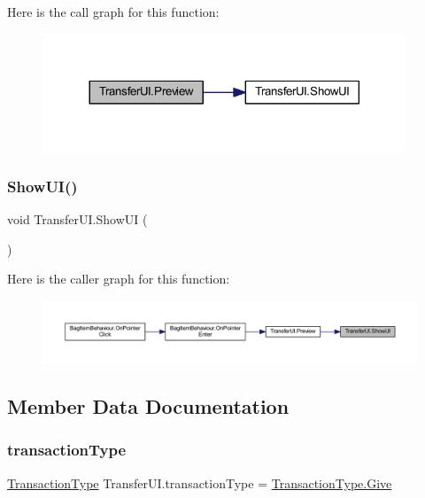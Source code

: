 Here is the call graph for this function\+:\nopagebreak
\begin{figure}[H]
\begin{center}
\leavevmode
\includegraphics[width=308pt]{class_transfer_u_i_a52bd586cae27d6570e207d856457a116_cgraph}
\end{center}
\end{figure}
\mbox{\label{class_transfer_u_i_acb1dacb30d206743a569f8dc6bf9e5e4}} 
\subsubsection{\texorpdfstring{ShowUI()}{ShowUI()}}
{\footnotesize\ttfamily void Transfer\+U\+I.\+Show\+UI (\begin{DoxyParamCaption}{ }\end{DoxyParamCaption})}

Here is the caller graph for this function\+:\nopagebreak
\begin{figure}[H]
\begin{center}
\leavevmode
\includegraphics[width=350pt]{class_transfer_u_i_acb1dacb30d206743a569f8dc6bf9e5e4_icgraph}
\end{center}
\end{figure}


\subsection{Member Data Documentation}
\mbox{\label{class_transfer_u_i_a7a235277eb0406680963562b2088d136}} 
\subsubsection{\texorpdfstring{transactionType}{transactionType}}
{\footnotesize\ttfamily \mbox{\hyperlink{class_transfer_u_i_acb894008318cb07b7144beb2d6d81606}{Transaction\+Type}} Transfer\+U\+I.\+transaction\+Type = \mbox{\hyperlink{class_transfer_u_i_acb894008318cb07b7144beb2d6d81606a2f355d9fa7accc561d3edc335de2fbcf}{Transaction\+Type.\+Give}}}

